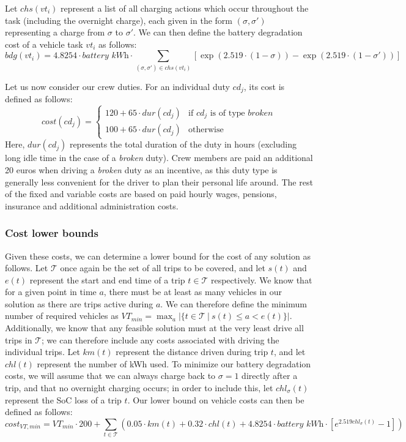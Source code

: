 \documentclass[]{article}
\begin{document}
Let $chs(vt_i)$ represent a list of all charging actions which occur throughout the task (including the overnight charge), each given in the form $(\sigma, \sigma')$ representing a charge from $\sigma$ to $\sigma'$. We can then define the battery degradation cost of a vehicle task $vt_i$ as follows:
\begin{equation}
  bdg(vt_i) = 4.8254 \cdot \textit{battery kWh} \cdot \sum_{(\sigma, \sigma') \in chs(vt_i)} [\exp(2.519 \cdot (1 - \sigma)) - \exp(2.519 \cdot (1 - \sigma'))] \nonumber
\end{equation}

\noindent Let us now consider our crew duties. For an individual duty $cd_j$, its cost is defined as follows:
\begin{equation}
  cost(cd_j) =
  \begin{cases}
    120 + 65 \cdot dur(cd_j) & \text{if } cd_j \text{ is of type }\textit{broken} \\ 
    100 + 65 \cdot dur(cd_j) & \text{otherwise}
  \end{cases} \nonumber
\end{equation}
Here, $dur(cd_j)$ represents the total duration of the duty in hours (excluding long idle time in the case of a \textit{broken} duty). Crew members are paid an additional 20 euros when driving a \textit{broken} duty as an incentive, as this duty type is generally less convenient for the driver to plan their personal life around. The rest of the fixed and variable costs are based on paid hourly wages, pensions, insurance and additional administration costs.

\subsubsection{Cost lower bounds}
Given these costs, we can determine a lower bound for the cost of any solution as follows. Let $\mathcal{T}$ once again be the set of all trips to be covered, and let $s(t)$ and $e(t)$ represent the start and end time of a trip $t \in \mathcal{T}$ respectively. We know that for a given point in time $a$, there must be at least as many vehicles in our solution as there are trips active during $a$. We can therefore define the minimum number of required vehicles as $VT_{min} = \max_{a} |\{ t \in \mathcal{T} \:|\: s(t) \leq a < e(t) \}|$. Additionally, we know that any feasible solution must at the very least drive all trips in $\mathcal{T}$; we can therefore include any costs associated with driving the individual trips. Let $km(t)$ represent the distance driven during trip $t$, and let $chl(t)$ represent the number of kWh used. To minimize our battery degradation costs, we will assume that we can always charge back to $\sigma=1$ directly after a trip, and that no overnight charging occurs; in order to include this, let $chl_\sigma(t)$ represent the SoC loss of a trip $t$. Our lower bound on vehicle costs can then be defined as follows: 
\begin{equation}
  cost_{VT,min} = VT_{min} \cdot 200 + \sum_{t \in \mathcal{T}} (0.05 \cdot km(t) + 0.32 \cdot chl(t) +  4.8254 \cdot \textit{battery kWh} \cdot [e^{2.519chl_\sigma(t)} - 1]) \nonumber
\end{equation}
\end{document}
